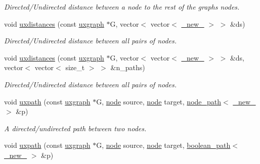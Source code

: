 \begin{DoxyCompactItemize}
\begin{DoxyCompactList}\small\item\em Directed/\+Undirected distance between a node to the rest of the graph\textquotesingle{}s nodes. \end{DoxyCompactList}\item 
void \hyperlink{namespacelgraph_1_1traversal_ab04202d9a05b39b38e5e8f35475b1665}{uxdistances} (const \hyperlink{classlgraph_1_1utils_1_1uxgraph}{uxgraph} $\ast$G, vector$<$ vector$<$ \hyperlink{namespacelgraph_1_1utils_a2c84bfde888c42ab3ad6b2cb8a364240}{\+\_\+new\+\_\+} $>$ $>$ \&ds)
\begin{DoxyCompactList}\small\item\em Directed/\+Undirected distance between all pairs of nodes. \end{DoxyCompactList}\item 
void \hyperlink{namespacelgraph_1_1traversal_a03137bf22fbff273ab60ec13db244ad5}{uxdistances} (const \hyperlink{classlgraph_1_1utils_1_1uxgraph}{uxgraph} $\ast$G, vector$<$ vector$<$ \hyperlink{namespacelgraph_1_1utils_a2c84bfde888c42ab3ad6b2cb8a364240}{\+\_\+new\+\_\+} $>$ $>$ \&ds, vector$<$ vector$<$ size\+\_\+t $>$ $>$ \&n\+\_\+paths)
\begin{DoxyCompactList}\small\item\em Directed/\+Undirected distance between all pairs of nodes. \end{DoxyCompactList}\item 
void \hyperlink{namespacelgraph_1_1traversal_a143fd991f5e035c64c94b2ac8d84b08c}{uxpath} (const \hyperlink{classlgraph_1_1utils_1_1uxgraph}{uxgraph} $\ast$G, \hyperlink{namespacelgraph_1_1utils_ab9c6b34241f0b68372c55f34c460e863}{node} source, \hyperlink{namespacelgraph_1_1utils_ab9c6b34241f0b68372c55f34c460e863}{node} target, \hyperlink{classlgraph_1_1utils_1_1node__path}{node\+\_\+path}$<$ \hyperlink{namespacelgraph_1_1utils_a2c84bfde888c42ab3ad6b2cb8a364240}{\+\_\+new\+\_\+} $>$ \&p)
\begin{DoxyCompactList}\small\item\em A directed/undirected path between two nodes. \end{DoxyCompactList}\item 
void \hyperlink{namespacelgraph_1_1traversal_a5873d9c87596daa9002ee537e1ac0252}{uxpath} (const \hyperlink{classlgraph_1_1utils_1_1uxgraph}{uxgraph} $\ast$G, \hyperlink{namespacelgraph_1_1utils_ab9c6b34241f0b68372c55f34c460e863}{node} source, \hyperlink{namespacelgraph_1_1utils_ab9c6b34241f0b68372c55f34c460e863}{node} target, \hyperlink{classlgraph_1_1utils_1_1boolean__path}{boolean\+\_\+path}$<$ \hyperlink{namespacelgraph_1_1utils_a2c84bfde888c42ab3ad6b2cb8a364240}{\+\_\+new\+\_\+} $>$ \&p)

\end{DoxyCompactItemize}
